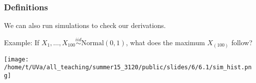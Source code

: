 \documentclass{beamer}
\begin{document}
\begin{frame}
\frametitle{Definitions}

We can also run simulations to check our derivations. 
\newline

Example: If $X_1, \ldots, X_{100} \overset{iid}{\sim} \text{Normal}(0, 1)$, what does the maximum $X_{(100)}$ follow?

\begin{center}
\texttt{[image: /home/t/UVa/all\_teaching/summer15\_3120/public/slides/6/6.1/sim\_hist.png]}
\end{center}

\end{frame}
\end{document}
